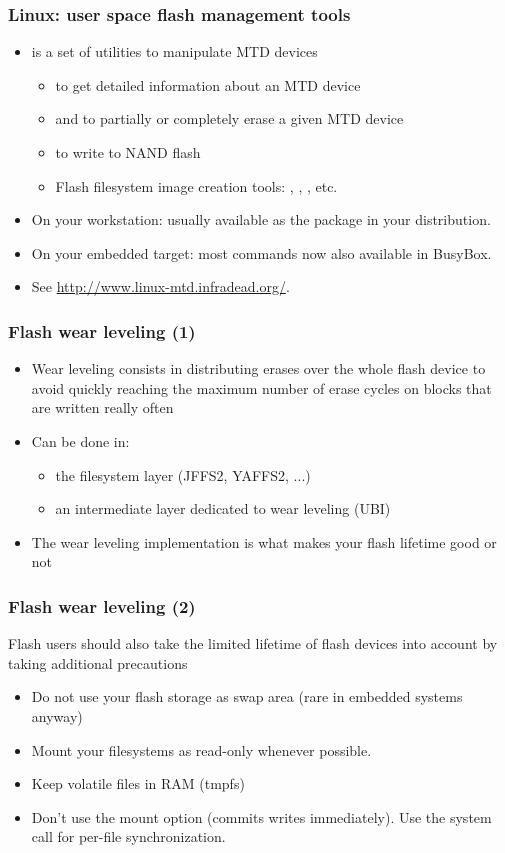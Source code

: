 \begin{frame}
  \frametitle{Linux: user space flash management tools}
  \begin{itemize}
  \item {} is a set of utilities to manipulate MTD devices
    \begin{itemize}
    \item {} to get detailed information about an MTD device
    \item {} and  to partially or
          completely erase a given MTD device
    \item {} to write to NAND flash
    \item Flash filesystem image creation tools: ,
      , , etc.
    \end{itemize}
  \item On your workstation: usually available as the 
      package in your distribution.
  \item On your embedded target: most commands now also available
      in BusyBox.
  \item See \url{http://www.linux-mtd.infradead.org/}.
  \end{itemize}
\end{frame}


\begin{frame}
  \frametitle{Flash wear leveling (1)}
  \begin{itemize}
  \item Wear leveling consists in distributing erases over the whole
    flash device to avoid quickly reaching the maximum number of erase
    cycles on blocks that are written really often
  \item Can be done in:
    \begin{itemize}
    \item the filesystem layer (JFFS2, YAFFS2, ...)
    \item an intermediate layer dedicated to wear leveling (UBI)
    \end{itemize}
  \item The wear leveling implementation is what makes your flash
    lifetime good or not
  \end{itemize}
\end{frame}

\begin{frame}
  \frametitle{Flash wear leveling (2)}
  Flash users should also take the limited lifetime of flash
  devices into account by taking additional precautions
  \begin{itemize}
  \item Do not use your flash storage as swap area (rare in embedded
    systems anyway)
  \item Mount your filesystems as read-only whenever possible.
  \item Keep volatile files in RAM (tmpfs)
  \item Don't use the  mount option (commits writes
    immediately). Use the  system call for per-file
    synchronization.
  \end{itemize}
\end{frame}

